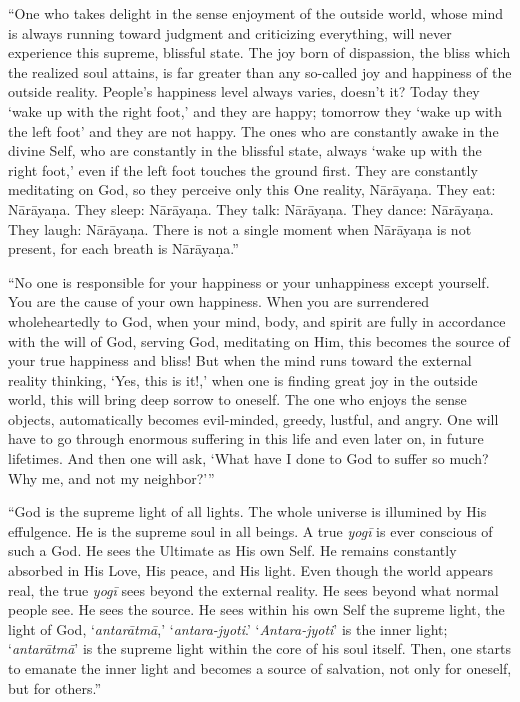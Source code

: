 \enquote{One who takes delight in the sense enjoyment of the outside world, whose mind is always running toward judgment and criticizing everything, will never experience this supreme, blissful state. The joy born of dispassion, the bliss which the realized soul attains, is far greater than any so-called joy and happiness of the outside reality. People’s happiness level always varies, doesn’t it? Today they \enquote{wake up with the right foot,} and they are happy; tomorrow they \enquote{wake up with the left foot} and they are not happy. The ones who are constantly awake in the divine Self, who are constantly in the blissful state, always \enquote{wake up with the right foot,} even if the left foot touches the ground first. They are constantly meditating on God, so they perceive only this One reality, Nārāyaṇa. They eat: Nārāyaṇa. They sleep: Nārāyaṇa. They talk: Nārāyaṇa. They dance: Nārāyaṇa. They laugh: Nārāyaṇa. There is not a single moment when Nārāyaṇa is not present, for each breath is Nārāyaṇa.}

\enquote{No one is responsible for your happiness or your unhappiness except yourself. You are the cause of your own happiness. When you are surrendered wholeheartedly to God, when your mind, body, and spirit are fully in accordance with the will of God, serving God, meditating on Him, this becomes the source of your true happiness and bliss! But when the mind runs toward the external reality thinking, \enquote{Yes, this is it!,} when one is finding great joy in the outside world, this will bring deep sorrow to oneself. The one who enjoys the sense objects, automatically becomes evil-minded, greedy, lustful, and angry. One will have to go through enormous suffering in this life and even later on, in future lifetimes. And then one will ask, \enquote{What have I done to God to suffer so much? Why me, and not my neighbor?}}

\enquote{God is the supreme light of all lights. The whole universe is illumined by His effulgence. He is the supreme soul in all beings. A true \textit{yogī} is ever conscious of such a God. He sees the Ultimate as His own Self. He remains constantly absorbed in His Love, His peace, and His light. Even though the world appears real, the true \textit{yogī} sees beyond the external reality. He sees beyond what normal people see. He sees the source. He sees within his own Self the supreme light, the light of God, \enquote{\textit{antarātmā},} \enquote{\textit{antara-jyoti}.} \enquote{\textit{Antara-jyoti}} is the inner light; \enquote{\textit{antarātmā}} is the supreme light within the core of his soul itself. Then, one starts to emanate the inner light and becomes a source of salvation, not only for oneself, but for others.}

